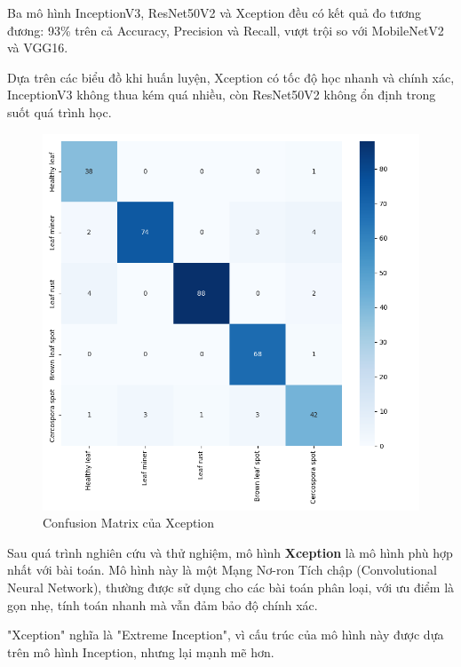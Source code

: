\documentclass[a4paper,14pt]{extarticle}
\begin{document}
	Ba mô hình InceptionV3, ResNet50V2 và Xception đều có kết quả đo tương đương: 93\% trên cả Accuracy, Precision và Recall, vượt trội so với MobileNetV2 và VGG16.
	
	Dựa trên các biểu đồ khi huấn luyện, Xception có tốc độ học nhanh và chính xác, InceptionV3 không thua kém quá nhiều, còn ResNet50V2 không ổn định trong suốt quá trình học.

	\begin{figure}[H]
		\centering
		\includegraphics[scale=0.5]{images/xception_matrix.png}
		\caption{Confusion Matrix của Xception}
	\end{figure}

	Sau quá trình nghiên cứu và thử nghiệm, mô hình \textbf{Xception} là mô hình phù hợp nhất với bài toán. Mô hình này là một Mạng Nơ-ron Tích chập (Convolutional Neural Network), thường được sử dụng cho các bài toán phân loại, với ưu điểm là gọn nhẹ, tính toán nhanh mà vẫn đảm bảo độ chính xác.

	"Xception" nghĩa là "Extreme Inception", vì cấu trúc của mô hình này được dựa trên mô hình Inception, nhưng lại mạnh mẽ hơn.
\end{document}
